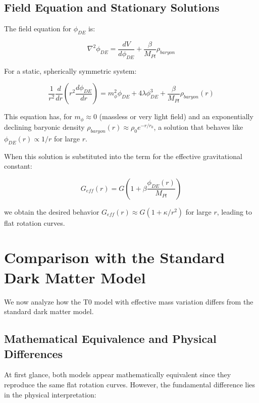 \documentclass[a4paper,12pt]{article}
\begin{document}
	\subsection{Field Equation and Stationary Solutions}
	
	The field equation for $\phi_{DE}$ is:
	
	\begin{equation}
		\nabla^2 \phi_{DE} = \frac{dV}{d\phi_{DE}} + \frac{\beta}{M_{Pl}}\rho_{baryon}
	\end{equation}
	
	For a static, spherically symmetric system:
	
	\begin{equation}
		\frac{1}{r^2}\frac{d}{dr}\left(r^2\frac{d\phi_{DE}}{dr}\right) = m_{\phi}^2\phi_{DE} + 4\lambda\phi_{DE}^3 + \frac{\beta}{M_{Pl}}\rho_{baryon}(r)
	\end{equation}
	
	This equation has, for $m_{\phi} \approx 0$ (massless or very light field) and an exponentially declining baryonic density $\rho_{baryon}(r) \approx \rho_0 e^{-r/r_0}$, a solution that behaves like $\phi_{DE}(r) \propto 1/r$ for large $r$.
	
	When this solution is substituted into the term for the effective gravitational constant:
	
	\begin{equation}
		G_{eff}(r) = G\left(1 + \beta\frac{\phi_{DE}(r)}{M_{Pl}}\right)
	\end{equation}
	
	we obtain the desired behavior $G_{eff}(r) \approx G(1 + \kappa/r^2)$ for large $r$, leading to flat rotation curves.
	
	\section{Comparison with the Standard Dark Matter Model}
	
	We now analyze how the T0 model with effective mass variation differs from the standard dark matter model.
	
	\subsection{Mathematical Equivalence and Physical Differences}
	
	At first glance, both models appear mathematically equivalent since they reproduce the same flat rotation curves. However, the fundamental difference lies in the physical interpretation:
	
\end{document}
